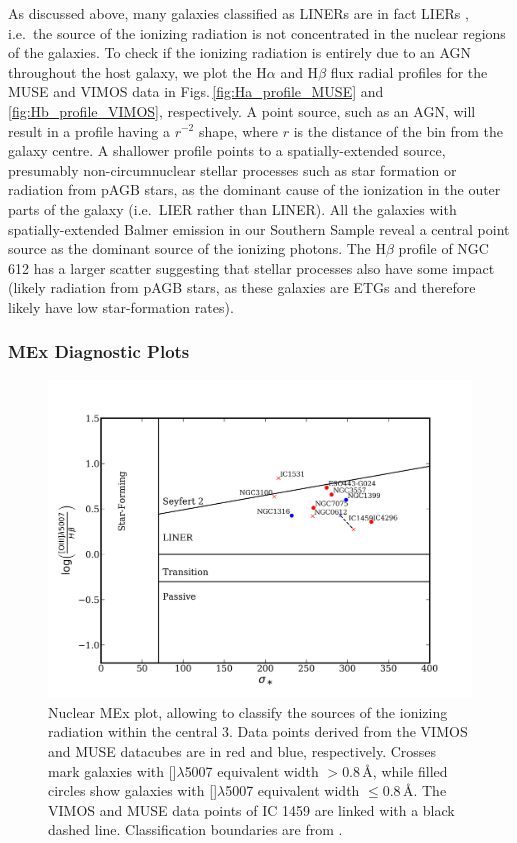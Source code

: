 \documentclass[a4paper,fleqn,usenatbib]{mnras}
\begin{document}
			
			As discussed above, many galaxies classified as LINERs are in fact LIERs \citep[see e.g.][]{Sarzi2005, Sarzi2010, Singh2013, Belfiore2016}, i.e.\ the source of the ionizing radiation is not concentrated in the nuclear regions of the galaxies. To check if the ionizing radiation is entirely due to an AGN throughout the host galaxy, we plot the H$\alpha$ and H$\beta$ flux radial profiles for the MUSE and VIMOS data in Figs.\,\ref{fig:Ha_profile_MUSE} and \ref{fig:Hb_profile_VIMOS}, respectively. A point source, such as an AGN, will result in a profile having a $r^{-2}$ shape, where $r$ is the distance of the bin from the galaxy centre. A shallower profile points to a spatially-extended source, presumably non-circumnuclear stellar processes such as star formation or radiation from pAGB stars, as the dominant cause of the ionization in the outer parts of the galaxy (i.e.\ LIER rather than LINER). All the galaxies with spatially-extended Balmer emission in our Southern Sample reveal a central point source as the dominant source of the ionizing photons. The H$\beta$ profile of NGC 612 has a larger scatter suggesting that stellar processes also have some impact (likely radiation from pAGB stars, as these galaxies are ETGs and therefore likely have low star-formation rates).

			


		\subsubsection{MEx Diagnostic Plots}
			\label{subsubsec:MEx}
			\begin{figure}
				\includegraphics[width=\columnwidth]{nuclear_MEx.png}
				\caption{Nuclear MEx plot, allowing to classify the sources of the ionizing radiation within the central 3\arcsec. Data points derived from the VIMOS and MUSE datacubes are in red and blue, respectively. Crosses mark galaxies with []$\lambda$5007 equivalent width $> 0.8$\,\AA, while filled circles show galaxies with []$\lambda$5007 equivalent width $\leqslant 0.8$\,\AA. The VIMOS and MUSE data points of IC 1459 are linked with a black dashed line. Classification boundaries are from \citet{Nyland2016}.}
				\label{fig:MEx}
			\end{figure}
\end{document}
